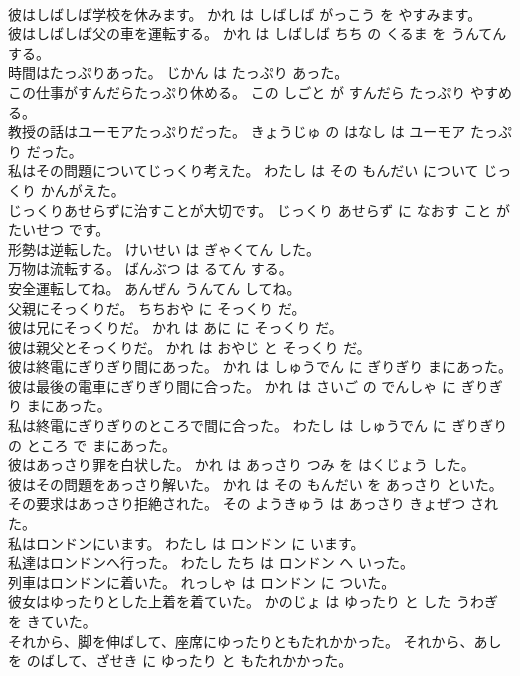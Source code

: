 \documentclass[8pt]{extreport}
\begin{document}
\begin{CJK}{UTF8}{min}
\\	彼はしばしば学校を休みます。	かれ は しばしば がっこう を やすみます。	
\\	彼はしばしば父の車を運転する。	かれ は しばしば ちち の くるま を うんてん する。	
\\	時間はたっぷりあった。	じかん は たっぷり あった。	
\\	この仕事がすんだらたっぷり休める。	この しごと が すんだら たっぷり やすめる。	
\\	教授の話はユーモアたっぷりだった。	きょうじゅ の はなし は ユーモア たっぷり だった。	
\\	私はその問題についてじっくり考えた。	わたし は その もんだい について じっくり かんがえた。	
\\	じっくりあせらずに治すことが大切です。	じっくり あせらず に なおす こと が たいせつ です。	
\\	形勢は逆転した。	けいせい は ぎゃくてん した。	
\\	万物は流転する。	ばんぶつ は るてん する。	
\\	安全運転してね。	あんぜん うんてん してね。	
\\	父親にそっくりだ。	ちちおや に そっくり だ。	
\\	彼は兄にそっくりだ。	かれ は あに に そっくり だ。	
\\	彼は親父とそっくりだ。	かれ は おやじ と そっくり だ。	
\\	彼は終電にぎりぎり間にあった。	かれ は しゅうでん に ぎりぎり まにあった。	
\\	彼は最後の電車にぎりぎり間に合った。	かれ は さいご の でんしゃ に ぎりぎり まにあった。	
\\	私は終電にぎりぎりのところで間に合った。	わたし は しゅうでん に ぎりぎり の ところ で まにあった。	
\\	彼はあっさり罪を白状した。	かれ は あっさり つみ を はくじょう した。	
\\	彼はその問題をあっさり解いた。	かれ は その もんだい を あっさり といた。	
\\	その要求はあっさり拒絶された。	その ようきゅう は あっさり きょぜつ された。	
\\	私はロンドンにいます。	わたし は ロンドン に います。	
\\	私達はロンドンへ行った。	わたし たち は ロンドン へ いった。	
\\	列車はロンドンに着いた。	れっしゃ は ロンドン に ついた。	
\\	彼女はゆったりとした上着を着ていた。	かのじょ は ゆったり と した うわぎ を きていた。	
\\	それから、脚を伸ばして、座席にゆったりともたれかかった。	それから、あし を のばして、ざせき に ゆったり と もたれかかった。	

\end{CJK}
\end{document}
